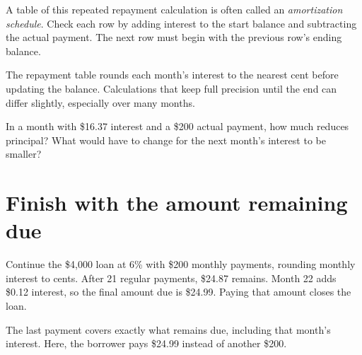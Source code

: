 \documentclass[11pt,letterpaper]{article}
\begin{document}
\par{}\par\medskip

A table of this repeated repayment calculation is often called an \emph{amortization schedule}. Check each row by adding interest to the start balance and subtracting the actual payment. The next row must begin with the previous row's ending balance.


\begin{tcolorbox}[title={State the rounding rule},breakable,colback=warm,colbacktitle=warm,coltitle=gold,colframe=gold!35]

The repayment table rounds each month's interest to the nearest cent before updating the balance. Calculations that keep full precision until the end can differ slightly, especially over many months.


\end{tcolorbox}

\begin{tcolorbox}[title={Pause and try 7},breakable]
In a month with \$16.37 interest and a \$200 actual payment, how much reduces principal? What would have to change for the next month's interest to be smaller?
\end{tcolorbox}


\section{Finish with the amount remaining due}

Continue the \$4,000 loan at 6\% with \$200 monthly payments, rounding monthly interest to cents. After 21 regular payments, \$24.87 remains. Month 22 adds \$0.12 interest, so the final amount due is \$24.99. Paying that amount closes the loan.


The last payment covers exactly what remains due, including that month's interest. Here, the borrower pays \$24.99 instead of another \$200.
\end{document}
